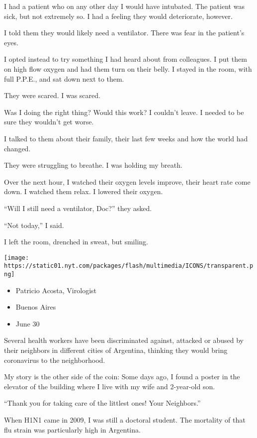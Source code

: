 I had a patient who on any other day I would have intubated. The patient
was sick, but not extremely so. I had a feeling they would deteriorate,
however.

I told them they would likely need a ventilator. There was fear in the
patient's eyes.

I opted instead to try something I had heard about from colleagues. I
put them on high flow oxygen and had them turn on their belly. I stayed
in the room, with full P.P.E., and sat down next to them.

They were scared. I was scared.

Was I doing the right thing? Would this work? I couldn't leave. I needed
to be sure they wouldn't get worse.

I talked to them about their family, their last few weeks and how the
world had changed.

They were struggling to breathe. I was holding my breath.

Over the next hour, I watched their oxygen levels improve, their heart
rate come down. I watched them relax. I lowered their oxygen.

``Will I still need a ventilator, Doc?'' they asked.

``Not today,'' I said.

I left the room, drenched in sweat, but smiling.

\texttt{[image: https://static01.nyt.com/packages/flash/multimedia/ICONS/transparent.png]}

\begin{itemize}
\tightlist
\item
  Patricio Acosta, Virologist
\item
  Buenos Aires
\item
  June 30
\end{itemize}

Several health workers have been discriminated against, attacked or
abused by their neighbors in different cities of Argentina, thinking
they would bring coronavirus to the neighborhood.

My story is the other side of the coin: Some days ago, I found a poster
in the elevator of the building where I live with my wife and 2-year-old
son.

``Thank you for taking care of the littlest ones! Your Neighbors.''

When H1N1 came in 2009, I was still a doctoral student. The mortality of
that flu strain was particularly high in Argentina.

